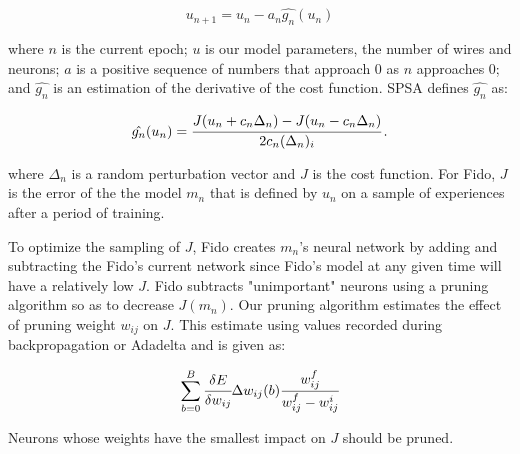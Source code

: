 \begin{equation}
	u_{n+1} = u_n - a_n\hat{g_n}(u_n)
	\label{equ::spsaupdate}
\end{equation}

\noindent

where $n$ is the current epoch; $u$ is our model parameters, the number of wires and neurons; $a$ is a positive sequence of numbers that approach 0 as $n$ approaches 0; and $\hat{g_n}$ is an estimation of the derivative of the cost function. SPSA defines $\hat{g_n}$ as:

\begin{equation}
	\hat{g_n}(u_n) = \cfrac{J(u_n + c_n\Delta_n)-J(u_n - c_n\Delta_n)}{2c_n(\Delta_n)_i}
	\,.
	\label{equ::spsaderivative}
\end{equation}

\noindent

where $\Delta_n$ is a random perturbation vector and $J$ is the cost function. For Fido, $J$ is the error of the the model $m_n$ that is defined by $u_n$ on a sample of experiences after a period of training.

To optimize the sampling of $J$, Fido creates $m_n$'s neural network by adding and subtracting the Fido's current network since Fido's model at any given time will have a relatively low $J$. Fido subtracts "unimportant" neurons using a pruning algorithm \cite{reed} so as to decrease $J(m_n)$. Our pruning algorithm estimates the effect of pruning weight $w_{ij}$ on $J$. This estimate using values recorded during backpropagation or Adadelta and is given as:

\begin{equation}
	\sum_{b=0}^{B}\cfrac{\delta E}{\delta w_{ij}}\Delta w_{ij}(b)\cfrac{w^f_{ij}}{w^f_{ij}-w^i_{ij}}
	\label{equ::sensitivity}
\end{equation}

Neurons whose weights have the smallest impact on $J$ should be pruned.
